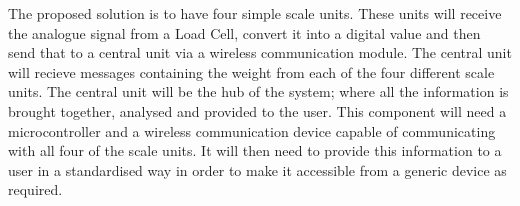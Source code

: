 The proposed solution is to have four simple scale units. These units will receive the analogue signal from a Load Cell, convert it into a digital value and then send that to a central unit via a wireless communication module. The central unit will recieve messages containing the weight from each of the four different scale units. The central unit will be the hub of the system; where all the information is brought together, analysed and provided to the user. This component will need a microcontroller and a wireless communication device capable of communicating with all four of the scale units. It will then need to provide this information to a user in a standardised way in order to make it accessible from a generic device as required.
